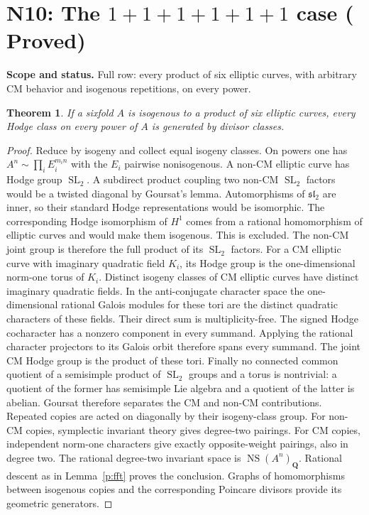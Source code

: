 \documentclass[10pt,reqno]{article}
\theoremstyle{emphasizedplain}
\DeclareRobustCommand{\provedstatus}{%
  \texorpdfstring{\textcolor{ProvedGreen}{\textbf{Proved}}}{Proved}}
\newtheorem{theorem}{Theorem}[section]
\theoremstyle{emphasizeddefinition}
\theoremstyle{emphasizeddefinition}
\DeclareMathOperator{\SL}{SL}
\DeclareMathOperator{\NS}{NS}
\newcommand{\Q}{\mathbf Q}
\newcommand{\status}[1]{%
  \par\nobreak\smallskip\noindent
  {\setlength{\fboxsep}{7pt}%
   \colorbox{ScopeBackground}{%
    \parbox{\dimexpr\linewidth-2\fboxsep\relax}{%
     \small\textbf{\textcolor{HeadingInk}{Scope and status.}} #1}}}%
  \par\nobreak\medskip}
\renewcommand{\small}{\fontsize{8.4}{10}\selectfont}
\begin{document}
\section{N10: The \texorpdfstring{$1+1+1+1+1+1$}{1+1+1+1+1+1} case (\provedstatus)}\label{sec:N10}

\status{Full row: every product of six elliptic curves, with arbitrary
CM behavior and isogenous repetitions, on every power.}
\begin{theorem}
If a sixfold $A$ is isogenous to a product of six elliptic curves, every
Hodge class on every power of $A$ is generated by divisor classes.
\end{theorem}
\begin{proof}
Reduce by isogeny and collect equal isogeny classes. On powers one has
$A^n\sim\prod_i E_i^{m_i n}$ with the $E_i$ pairwise nonisogenous.
A non-CM elliptic curve has Hodge group $\SL_2$.
A subdirect product coupling two non-CM $\SL_2$ factors would be a twisted
diagonal by Goursat's lemma. Automorphisms of $\mathfrak{sl}_2$ are inner,
so their standard Hodge representations would be isomorphic. The
corresponding Hodge isomorphism of $H^1$ comes from a rational
homomorphism of elliptic curves and would make them isogenous.
This is excluded. The non-CM joint group is therefore the full product
of its $\SL_2$ factors.
For a CM elliptic curve with imaginary quadratic field $K_i$, its Hodge
group is the one-dimensional norm-one torus of $K_i$.
Distinct isogeny classes of CM elliptic curves have distinct imaginary
quadratic fields. In the anti-conjugate character space the one-dimensional
rational Galois modules for these tori are the distinct quadratic characters
of these fields. Their direct sum is multiplicity-free. The signed Hodge
cocharacter has a nonzero component in every summand. Applying the
rational character projectors to its Galois orbit therefore spans every
summand. The joint CM Hodge group is the product of these tori.
Finally no connected common quotient of a semisimple product of $\SL_2$
groups and a torus is nontrivial: a quotient of the former has semisimple
Lie algebra and a quotient of the latter is abelian. Goursat therefore
separates the CM and non-CM contributions.
Repeated copies are acted on diagonally by their isogeny-class group.
For non-CM copies, symplectic invariant theory gives degree-two pairings.
For CM copies, independent norm-one characters give exactly opposite-weight
pairings, also in degree two. The rational degree-two invariant space is
$\NS(A^n)_\Q$. Rational descent as in Lemma~\ref{p:fft} proves the conclusion.
Graphs of homomorphisms between isogenous copies and the corresponding
Poincare divisors provide its geometric generators.
\end{proof}
\end{document}
